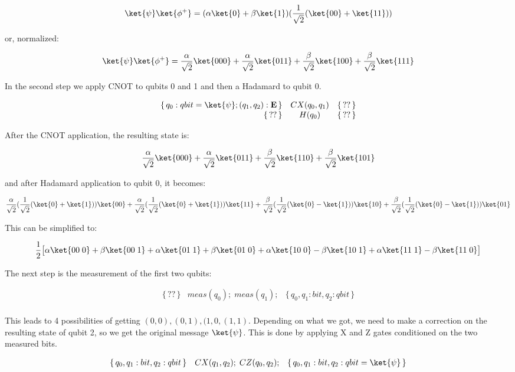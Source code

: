 \documentclass[acmsmall,nonacm,review,timestamp]{acmart}
\newcommand{\E}{\ensuremath{\mathbf{E}}\xspace}
\newcommand\hoare[3]{\{\,#1\,\}&#2&\{\,#3\,\}}
\begin{document}
\begin{enumerate}
\[  \ket{\psi}\ket{\phi^+} = (\alpha\ket{0} + \beta\ket{1})(\frac{1}{\sqrt{2}}(\ket{00} + \ket{11})) \]

or, normalized:

\[  \ket{\psi}\ket{\phi^+} = \frac{\alpha}{\sqrt{2}}\ket{000} + \frac{\alpha}{\sqrt{2}}\ket{011} + \frac{\beta}{\sqrt{2}}\ket{100} + \frac{\beta}{\sqrt{2}}\ket{111} \]

In the second step we apply CNOT to qubits 0 and 1 and then a Hadamard to qubit 0.

\[ \begin{array}{rcl}
\hoare{q_0: qbit = \ket{\psi}; (q_1,q_2) : \E}{CX(q_0, q_1)}{??} \\
\hoare{??}{H(q_0)}{??} \\
\end{array} \]

After the CNOT application, the resulting state is:

\[ \frac{\alpha}{\sqrt{2}}\ket{000} + \frac{\alpha}{\sqrt{2}}\ket{011} + \frac{\beta}{\sqrt{2}}\ket{110} + \frac{\beta}{\sqrt{2}}\ket{101} \]

and after Hadamard application to qubit 0, it becomes:

\[ \frac{\alpha}{\sqrt{2}}(\frac{1}{\sqrt{2}}(\ket{0} + \ket{1}))\ket{00} + \frac{\alpha}{\sqrt{2}}(\frac{1}{\sqrt{2}}(\ket{0} + \ket{1}))\ket{11} + \frac{\beta}{\sqrt{2}}(\frac{1}{\sqrt{2}}(\ket{0} - \ket{1}))\ket{10} + \frac{\beta}{\sqrt{2}}(\frac{1}{\sqrt{2}}(\ket{0} - \ket{1}))\ket{01} \]

This can be simplified to:

\[ \frac{1}{2}\big[\alpha\ket{00\;0} + \beta\ket{00\;1} + \alpha\ket{01\;1} + \beta\ket{01\;0} + \alpha\ket{10\;0} - \beta\ket{10\;1} + \alpha\ket{11\;1} - \beta\ket{11\;0}\big] \]

The next step is the measurement of the first two qubits:

\[ \begin{array}{rcl}
\hoare{??}{meas(q_0); \; meas(q_1);}{q_0, q_1 : bit, q_2: qbit}\\
\end{array} \]

This leads to 4 possibilities of getting $(0, 0), (0, 1), (1, 0, (1, 1)$. Depending on what we got, we need to make a correction on the resulting state of qubit 2, so we get the original message $\ket{\psi}$. This is done by applying X and Z gates conditioned on the two measured bits.

\[ \begin{array}{rcl}
\hoare{q_0, q_1 : bit, q_2: qbit}{CX(q_1, q_2); \; CZ(q_0, q_2);}{q_0, q_1 : bit, q_2: qbit = \ket{\psi}}\\
\end{array} \]


\end{enumerate}
\end{document}
